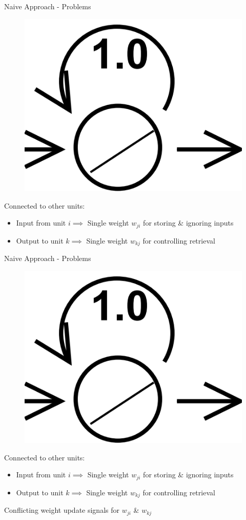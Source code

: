 \documentclass[10pt, aspectratio=169]{beamer}
\begin{document}
\begin{frame}[t]{Naive Approach - Problems}
\begin{figure}
        \centering
        \includegraphics[width=0.25\linewidth]{images/ConstantErrorCarousel.png}
    \end{figure}
Connected to other units:
\begin{itemize}
    \item Input from unit \begin{math}i\implies\end{math} Single weight \begin{math}w_{ji}\end{math} for storing \& ignoring inputs
    
    \item Output to unit \begin{math}k\implies\end{math} Single weight \begin{math}w_{kj}\end{math} for controlling retrieval
\end{itemize}
\end{frame}

\begin{frame}[t]{Naive Approach - Problems}
\begin{figure}
        \centering
        \includegraphics[width=0.25\linewidth]{images/ConstantErrorCarousel.png}
    \end{figure}
Connected to other units:
\begin{itemize}
    \item Input from unit \begin{math}i\implies\end{math} Single weight \begin{math}w_{ji}\end{math} for storing \& ignoring inputs
    
    \item Output to unit \begin{math}k\implies\end{math} Single weight \begin{math}w_{kj}\end{math} for controlling retrieval
\end{itemize}
Conflicting weight update signals for \begin{math}w_{ji}\end{math} \& \begin{math}w_{kj}\end{math}
\end{frame}
\end{document}

